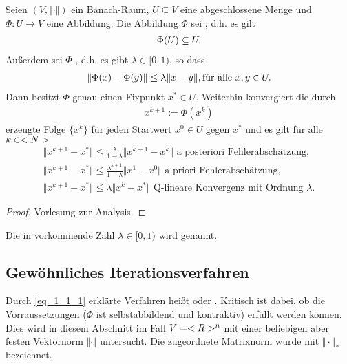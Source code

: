 \begin{proposition}[Banach]
	Seien $(V, \Vert \cdot \Vert)$ ein Banach-Raum, $U \subseteq V$ eine abgeschlossene Menge und $\Phi: U \to V$ eine Abbildung. Die Abbildung $\Phi$ sei , d.h. es gilt
	\begin{align}
		\Phi(U) \subseteq U.\notag
	\end{align}
	Außerdem sei $\Phi$ , d.h. es gibt $\lambda \in [0,1)$, so dass
	\begin{align}
		\Vert\Phi(x) - \Phi(y)\Vert \le \lambda \Vert x-y\Vert, \text{für alle } x,y \in U.\notag
	\end{align}
	Dann besitzt $\Phi$ genau einen Fixpunkt $x^{*} \in U$. Weiterhin konvergiert die durch
	\begin{align}
		x^{k+1} := \Phi(x^k) \label{eq_1_1_1}
	\end{align}
	erzeugte Folge $\{x^k\}$ für jeden Startwert $x^0 \in U$ gegen $x^{*}$ und es gilt für alle $k \in <N>$
	\begin{align}
		\Vert x^{k+1} - x^{*}\Vert \le \frac{\lambda}{1 - \lambda}\Vert x^{k+1} - x^k\Vert \text{ a posteriori Fehlerabschätzung},\\
		\Vert x^{k+1} - x^{*}\Vert \le \frac{\lambda^{k+1}}{1 - \lambda}\Vert x^1 - x^0\Vert \text{ a priori Fehlerabschätzung},\\
		\Vert x^{k+1} - x^{*}\Vert \le \lambda \Vert x^{k} - x^{*}\Vert \text{ Q-lineare Konvergenz mit Ordnung }\lambda.
	\end{align}
\end{proposition}

\begin{proof}
	Vorlesung zur Analysis.
\end{proof}

Die in  vorkommende Zahl $\lambda \in [0,1)$ wird  genannt. 

\subsection{Gewöhnliches Iterationsverfahren}

Durch \ref{eq_1_1_1} erklärte Verfahren heißt  oder . Kritisch ist dabei, ob die Vorraussetzungen ($\Phi$ ist selbstabbildend und kontraktiv) erfüllt werden können. Dies wird in diesem Abschnitt im Fall $V = <R>^n$ mit einer beliebigen aber festen Vektornorm $\Vert \cdot \Vert$ untersucht. Die zugeordnete Matrixnorm wurde mit $\Vert \cdot \Vert_{\ast}$ bezeichnet.

